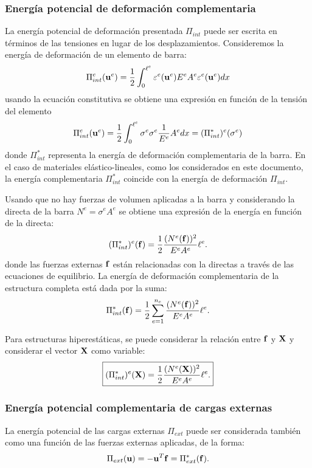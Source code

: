\subsubsection{Energía potencial de deformación complementaria}
%
La energía potencial de deformación presentada $\Pi_{int}$ puede ser escrita en términos de las tensiones en lugar de los desplazamientos. %
%
Consideremos la energía de deformación de un elemento de barra:
%
\begin{equation}
\Pi_{int}^e({\bf u}^e) = \frac{1}{2} \int_0^{\ell^e} \varepsilon^e({\bf u}^e) E^e A^e \varepsilon^e({\bf u}^e) dx
\end{equation}
%
usando la ecuación constitutiva se obtiene una expresión en función de la tensión del elemento
%
\begin{equation}
\Pi_{int}^e({\bf u}^e) = \frac{1}{2} \int_0^{\ell^e} \sigma^e \sigma^e \frac{1}{E^e} A^e dx = (\Pi_{int}^*)^e(\sigma^e) 
\end{equation}
%
donde $\Pi_{int}^*$ representa la energía de deformación complementaria de la barra. %
%
En el caso de materiales elástico-lineales, como los considerados en este documento, la energía complementaria $\Pi_{int}^*$ coincide con la energía de deformación $\Pi_{int}$.

Usando que no hay fuerzas de volumen aplicadas a la barra y considerando la directa de la barra $N^e = \sigma^e A^e$ se obtiene una expresión de la energía en función de la directa:
%
\begin{equation}
(\Pi_{int}^*)^e({\bf f}) = \frac{1}{2} \frac{(N^e ({\bf f}))^2}{E^e A^e} \ell^e.
\end{equation}
%
donde las fuerzas externas ${\bf f}$ están relacionadas con la directas a través de las ecuaciones de equilibrio. %
%
La energía de deformación complementaria de la estructura completa está dada por la suma:
%
\begin{equation}\label{eqn:Udef}
\Pi_{int}^*({\bf f}) =  \frac{1}{2} \sum_{e=1}^{n_e} \frac{(N^e ({\bf f}))^2}{E^e A^e} \ell^e.
\end{equation}

Para estructuras hiperestáticas, se puede considerar la relación entre ${\bf f}$ y ${\bf X}$ y considerar el vector ${\bf X}$ como variable:
%
\begin{equation}
\boxed{
(\Pi_{int}^*)^e({\bf X}) = \frac{1}{2} \frac{(N^e ({\bf X}))^2}{E^e A^e} \ell^e.
}
\end{equation}

\subsubsection{Energía potencial complementaria de cargas externas}
La energía potencial de las cargas externas $\Pi_{ext}$ puede ser considerada también como una función de las fuerzas externas aplicadas, de la forma:
%
\begin{equation}\label{eqn:Vdef}
\Pi_{ext}({\bf u}) = -{\bf u}^T {\bf f} = \Pi_{ext}^*({\bf f}).
\end{equation}





